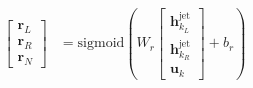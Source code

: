 \documentclass{beamer}
\begin{document}
\begin{frame}
\begin{columns}
\begin{column}{0.7\textwidth}
{{\begin{align*}
         \begin{bmatrix}
         \mathbf{r}_L \\
         \mathbf{r}_R \\
         \mathbf{r}_N
         \end{bmatrix} &= \text{sigmoid} \left( W_r
         \begin{bmatrix}
             \mathbf{h}^\text{jet}_{k_L} \\
             \mathbf{h}^\text{jet}_{k_R} \\
             \mathbf{u}_{k}
         \end{bmatrix} + b_r
         \right)
     \end{align*}}
         }

        \end{column}
        \begin{column}{0.3\textwidth}
            \centering

\end{column}
\end{columns}
\end{frame}
\end{document}

